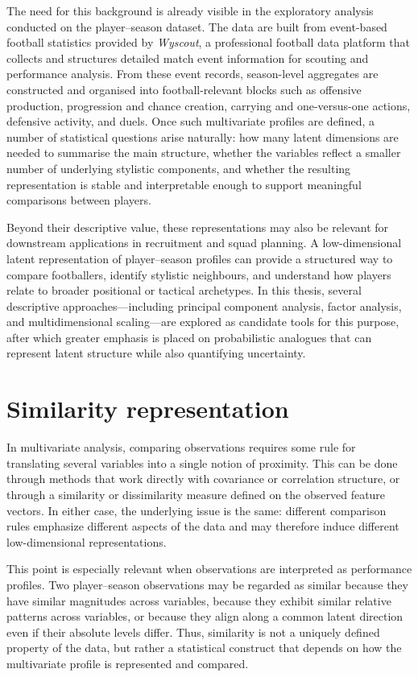 The need for this background is already visible in the exploratory analysis conducted on the player--season dataset. The data are built from event-based football statistics provided by \emph{Wyscout}, a professional football data platform that collects and structures detailed match event information for scouting and performance analysis. From these event records, season-level aggregates are constructed and organised into football-relevant blocks such as offensive production, progression and chance creation, carrying and one-versus-one actions, defensive activity, and duels. Once such multivariate profiles are defined, a number of statistical questions arise naturally: how many latent dimensions are needed to summarise the main structure, whether the variables reflect a smaller number of underlying stylistic components, and whether the resulting representation is stable and interpretable enough to support meaningful comparisons between players.

Beyond their descriptive value, these representations may also be relevant for downstream applications in recruitment and squad planning. A low-dimensional latent representation of player--season profiles can provide a structured way to compare footballers, identify stylistic neighbours, and understand how players relate to broader positional or tactical archetypes. In this thesis, several descriptive approaches---including principal component analysis, factor analysis, and multidimensional scaling---are explored as candidate tools for this purpose, after which greater emphasis is placed on probabilistic analogues that can represent latent structure while also quantifying uncertainty.

\section{Similarity representation}

In multivariate analysis, comparing observations requires some rule for translating several variables into a single notion of proximity. This can be done through methods that work directly with covariance or correlation structure, or through a similarity or dissimilarity measure defined on the observed feature vectors. In either case, the underlying issue is the same: different comparison rules emphasize different aspects of the data and may therefore induce different low-dimensional representations.

This point is especially relevant when observations are interpreted as performance profiles. Two player--season observations may be regarded as similar because they have similar magnitudes across variables, because they exhibit similar relative patterns across variables, or because they align along a common latent direction even if their absolute levels differ. Thus, similarity is not a uniquely defined property of the data, but rather a statistical construct that depends on how the multivariate profile is represented and compared.

